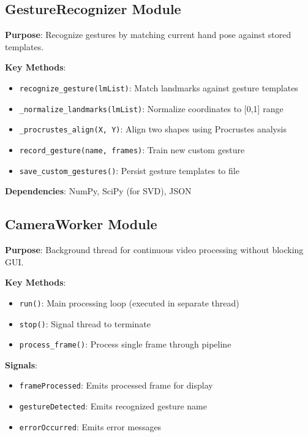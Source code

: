 \documentclass[12pt,a4paper]{report}
\begin{document}
\subsection{GestureRecognizer Module}

\textbf{Purpose}: Recognize gestures by matching current hand pose against stored templates.

\textbf{Key Methods}:
\begin{itemize}
    \item \texttt{recognize\_gesture(lmList)}: Match landmarks against gesture templates
    \item \texttt{\_normalize\_landmarks(lmList)}: Normalize coordinates to [0,1] range
    \item \texttt{\_procrustes\_align(X, Y)}: Align two shapes using Procrustes analysis
    \item \texttt{record\_gesture(name, frames)}: Train new custom gesture
    \item \texttt{save\_custom\_gestures()}: Persist gesture templates to file
\end{itemize}

\textbf{Dependencies}: NumPy, SciPy (for SVD), JSON

\subsection{CameraWorker Module}

\textbf{Purpose}: Background thread for continuous video processing without blocking GUI.

\textbf{Key Methods}:
\begin{itemize}
    \item \texttt{run()}: Main processing loop (executed in separate thread)
    \item \texttt{stop()}: Signal thread to terminate
    \item \texttt{process\_frame()}: Process single frame through pipeline
\end{itemize}

\textbf{Signals}:
\begin{itemize}
    \item \texttt{frameProcessed}: Emits processed frame for display
    \item \texttt{gestureDetected}: Emits recognized gesture name
    \item \texttt{errorOccurred}: Emits error messages
\end{itemize}
\end{document}

